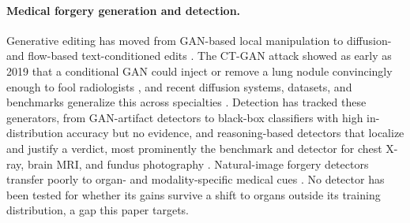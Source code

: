 \documentclass[10pt,twocolumn,letterpaper]{article}
\begin{document}
\paragraph{Medical forgery generation and detection.} Generative editing has moved from GAN-based local manipulation to diffusion- and flow-based text-conditioned edits \cite{diffusion_survey_2024, latent_diffusion_2022, instruct_pix2pix_2023}. The CT-GAN attack showed as early as 2019 that a conditional GAN could inject or remove a lung nodule convincingly enough to fool radiologists \cite{ctgan_attack_2019}, and recent diffusion systems, datasets, and benchmarks generalize this across specialties \cite{medisyn_2024, miedb_2026, m3dsynth_2023, text_guided_medical_editing_2025, multimodal_foundation_models_2023, medical_data_augmentation_2023, gan_medical_synthesis_2022}. Detection has tracked these generators, from GAN-artifact detectors \cite{ctgan2022} to black-box classifiers with high in-distribution accuracy but no evidence, and reasoning-based detectors that localize and justify a verdict, most prominently the benchmark and detector for chest X-ray, brain MRI, and fundus photography \cite{medical_forgery_survey_2023, medforge2026}. Natural-image forgery detectors \cite{gan_fingerprint_detection_2020, vision_transformer_forgery_2023, clip_forgery_detection_2023, natural_deepfake_survey_2024} transfer poorly to organ- and modality-specific medical cues \cite{biotampernet2026}. No detector has been tested for whether its gains survive a shift to organs outside its training distribution, a gap this paper targets.
\end{document}
